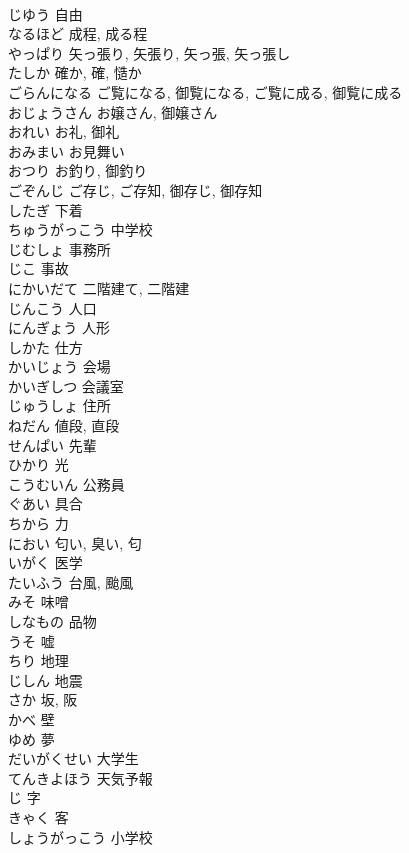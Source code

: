 \documentclass[8pt]{extreport}
\begin{document}
\begin{CJK}{UTF8}{min}
\\	じゆう	自由
\\	なるほど	成程, 成る程
\\	やっぱり	矢っ張り, 矢張り, 矢っ張, 矢っ張し
\\	たしか	確か, 確, 慥か
\\	ごらんになる	ご覧になる, 御覧になる, ご覧に成る, 御覧に成る
\\	おじょうさん	お嬢さん, 御嬢さん
\\	おれい	お礼, 御礼
\\	おみまい	お見舞い
\\	おつり	お釣り, 御釣り
\\	ごぞんじ	ご存じ, ご存知, 御存じ, 御存知
\\	したぎ	下着
\\	ちゅうがっこう	中学校
\\	じむしょ	事務所
\\	じこ	事故
\\	にかいだて	二階建て, 二階建
\\	じんこう	人口
\\	にんぎょう	人形
\\	しかた	仕方
\\	かいじょう	会場
\\	かいぎしつ	会議室
\\	じゅうしょ	住所
\\	ねだん	値段, 直段
\\	せんぱい	先輩
\\	ひかり	光
\\	こうむいん	公務員
\\	ぐあい	具合
\\	ちから	力
\\	におい	匂い, 臭い, 匂
\\	いがく	医学
\\	たいふう	台風, 颱風
\\	みそ	味噌
\\	しなもの	品物
\\	うそ	嘘
\\	ちり	地理
\\	じしん	地震
\\	さか	坂, 阪
\\	かべ	壁
\\	ゆめ	夢
\\	だいがくせい	大学生
\\	てんきよほう	天気予報
\\	じ	字
\\	きゃく	客
\\	しょうがっこう	小学校

\end{CJK}
\end{document}
